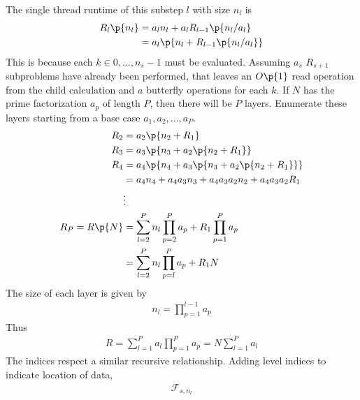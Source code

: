 \documentclass[11pt, a4paper]{article}
\begin{document}
The single thread runtime of this substep $l$ with size $n_{l}$ is
\begin{equation}\begin{aligned}
    R_{l}\p{n_{l}} &= a_{l} n_{l} + a_{l}R_{l-1} \p{n_{l}/a_{l}} \\
    &= a_{l} \p{n_{l} + R_{l-1}\p{n_{l}/a_{l}}} \\
\end{aligned}\end{equation}
This is because each $k \in 0, ..., n_{s}-1$ must be evaluated. Assuming $a_{s}$ $R_{s+1}$ subproblems have already been performed,
that leaves an $O\p{1}$ read operation from the child calculation and $a$ butterfly operations for each $k$.
If $N$ has the prime factorization $a_{p}$ of length $P$, then there will be $P$ layers. Enumerate these layers starting from
a base case $a_{1}, a_{2}, ..., a_{P}$.
\begin{equation}\begin{aligned}
    R_{2} &= a_{2} \p{n_{2} + R_{1}} \\
    R_{3} &= a_{3} \p{n_{3} + a_{2} \p{n_{2} + R_{1}}} \\
    R_{4} &= a_{4} \p{n_{4} + a_{3} \p{n_{3} + a_{2} \p{n_{2} + R_{1}}}} \\
          &= a_{4} n_{4} + a_{4} a_{3} n_{3} + a_{4} a_{3} a_{2} n_{2} + a_{4} a_{3} a_{2} R_{1} \\
          &\vdots \\
    R_{P} =  R \p{N} &= \sum_{l=2}^{P} n_{l} \prod_{p=2}^{P} a_{p} + R_{1} \prod_{p=1}^{P} a_{p} \\
    &=  \sum_{l=2}^{P} n_{l} \prod_{p=l}^{P} a_{p} + R_{1} N \\
\end{aligned}\end{equation}
The size of each layer is given by
\begin{equation}\begin{aligned}
    n_{l} = \prod_{p=1}^{l-1} a_{p}
\end{aligned}\end{equation}
Thus
\begin{equation}\begin{aligned}
    R = \sum_{l=1}^{P} a_{l} \prod_{p=1}^{P} a_{p} = N \sum_{l=1}^{P} a_{l}
\end{aligned}\end{equation}
The indices respect a similar recursive relationship. Adding level indices to indicate
location of data,
\begin{equation}\begin{aligned}
    \mathcal{F}_{s,n_{l}} 
\end{aligned}\end{equation}
\end{document}
